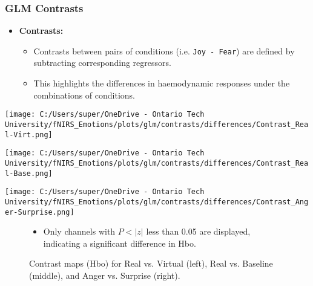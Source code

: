 \documentclass{beamer}
\begin{document}
\begin{frame}
    \frametitle{GLM Contrasts}
    \begin{itemize}
        \item \textbf{Contrasts:}
        \begin{itemize}
            \item Contrasts between pairs of conditions (i.e. \texttt{Joy - Fear}) are defined by subtracting corresponding regressors. 
            \item This highlights the differences in haemodynamic responses under the combinations of conditions.
        \end{itemize}
    \end{itemize}
    \begin{minipage}[t]{0.3\textwidth}
        \vspace{-\baselineskip}
        \texttt{[image: C:/Users/super/OneDrive - Ontario Tech University/fNIRS\_Emotions/plots/glm/contrasts/differences/Contrast\_Real-Virt.png]}
        \end{minipage}
        \begin{minipage}[t]{0.3\textwidth}
        \vspace{-\baselineskip}
        \texttt{[image: C:/Users/super/OneDrive - Ontario Tech University/fNIRS\_Emotions/plots/glm/contrasts/differences/Contrast\_Real-Base.png]}
        \end{minipage}
        \begin{minipage}[t]{0.3\textwidth}
        \vspace{-\baselineskip}
        \texttt{[image: C:/Users/super/OneDrive - Ontario Tech University/fNIRS\_Emotions/plots/glm/contrasts/differences/Contrast\_Anger-Surprise.png]}
        \end{minipage}  \begin{figure}
        \caption{Contrast maps (Hbo) for Real vs. Virtual (left), Real vs. Baseline (middle), and Anger vs. Surprise (right).}
        \begin{itemize}
            \item Only channels with \(P < |z|\) less than 0.05 are displayed, indicating a significant difference in Hbo.
        \end{itemize}
    \end{figure}
\end{frame}
\end{document}
